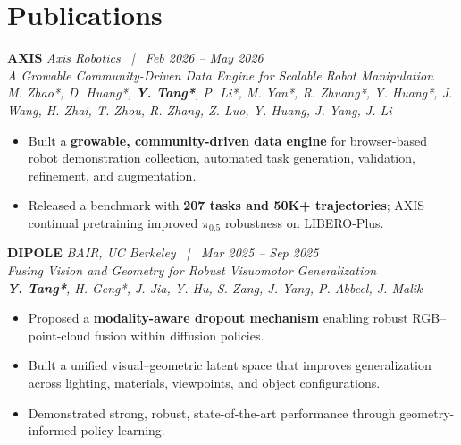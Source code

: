 \documentclass{chicv}
\begin{document}
\section*{Publications}
\textbf{\large AXIS} \hfill \textit{Axis Robotics \ | \ Feb 2026 -- May 2026} \\
\textit{\fontsize{9.5pt}{12pt}\selectfont A Growable Community-Driven Data Engine for Scalable Robot Manipulation} \\
\textit{{\color{darkgray} M. Zhao*}, {\color{darkgray} D. Huang*}, \textbf{Y. Tang*}, {\color{darkgray} P. Li*},
{\color{darkgray} M. Yan*}, {\color{darkgray} R. Zhuang*}, {\color{darkgray} Y. Huang*}, {\color{darkgray} J. Wang},
{\color{darkgray} H. Zhai}, {\color{darkgray} T. Zhou}, {\color{darkgray} R. Zhang}, {\color{darkgray} Z. Luo},
{\color{darkgray} Y. Huang}, {\color{darkgray} J. Yang}, {\color{darkgray} J. Li}}
\begin{itemize}[noitemsep, topsep=0pt]
    \item Built a \textbf{growable, community-driven data engine} for browser-based robot demonstration collection, automated task generation, validation, refinement, and augmentation.
    \item Released a benchmark with \textbf{207 tasks and 50K+ trajectories}; AXIS continual pretraining improved $\pi_{0.5}$ robustness on LIBERO-Plus.
\end{itemize}

\textbf{\large DIPOLE} \hfill \textit{BAIR, UC Berkeley \ | \ Mar 2025 -- Sep 2025} \\
\textit{\fontsize{9.5pt}{12pt}\selectfont Fusing Vision and Geometry for Robust
Visuomotor Generalization} \\
\textit{\textit{\textbf{Y. Tang*}}, {\color{darkgray} H. Geng*}, {\color{darkgray} J. Jia}, {\color{darkgray} Y. Hu}, {\color{darkgray} S. Zang}, 
{\color{darkgray} J. Yang}, {\color{darkgray} P. Abbeel}, {\color{darkgray} J. Malik}}
\begin{itemize}[noitemsep, topsep=0pt]
    \item Proposed a \textbf{modality-aware dropout mechanism} enabling robust RGB–point-cloud fusion within diffusion policies.
    \item Built a unified visual–geometric latent space that improves generalization across lighting, materials, viewpoints, and object configurations.
    \item Demonstrated strong, robust, state-of-the-art performance through geometry-informed policy learning.
\end{itemize}
\end{document}
